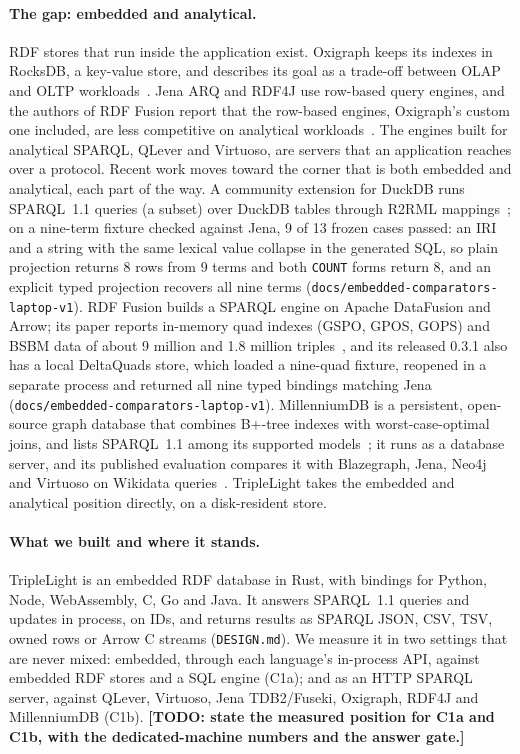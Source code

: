 \documentclass[sigconf, nonacm]{acmart}
\newcommand{\todo}[1]{\textbf{[TODO: #1]}}
\begin{document}
\paragraph{The gap: embedded and analytical.} RDF stores that run inside the application exist. Oxigraph keeps its indexes in RocksDB, a key-value store, and describes its goal as a trade-off between OLAP and OLTP workloads~\cite{oxigraphwiki}. Jena ARQ and RDF4J use row-based query engines, and the authors of RDF Fusion report that the row-based engines, Oxigraph's custom one included, are less competitive on analytical workloads~\cite{schwarzinger2025}. The engines built for analytical SPARQL, QLever and Virtuoso, are servers that an application reaches over a protocol.
Recent work moves toward the corner that is both embedded and analytical, each part of the way. A community extension for DuckDB runs SPARQL~1.1 queries (a subset) over DuckDB tables through R2RML mappings~\cite{duckdbrdf}; on a nine-term fixture checked against Jena, 9 of 13 frozen cases passed: an IRI and a string with the same lexical value collapse in the generated SQL, so plain projection returns 8 rows from 9 terms and both \texttt{COUNT} forms return 8, and an explicit typed projection recovers all nine terms (\texttt{docs/embedded-comparators-laptop-v1}).
RDF Fusion builds a SPARQL engine on Apache DataFusion and Arrow; its paper reports in-memory quad indexes (GSPO, GPOS, GOPS) and BSBM data of about 9 million and 1.8 million triples~\cite{schwarzinger2025}, and its released 0.3.1 also has a local DeltaQuads store, which loaded a nine-quad fixture, reopened in a separate process and returned all nine typed bindings matching Jena (\texttt{docs/embedded-comparators-laptop-v1}).
MillenniumDB is a persistent, open-source graph database that combines B+-tree indexes with worst-case-optimal joins, and lists SPARQL~1.1 among its supported models~\cite{vrgoc2021,mdbreadme}; it runs as a database server, and its published evaluation compares it with Blazegraph, Jena, Neo4j and Virtuoso on Wikidata queries~\cite{vrgoc2021}.
TripleLight takes the embedded and analytical position directly, on a disk-resident store.

\paragraph{What we built and where it stands.} TripleLight is an embedded RDF database in Rust, with bindings for Python, Node, WebAssembly, C, Go and Java.
It answers SPARQL~1.1 queries and updates in process, on IDs, and returns results as SPARQL JSON, CSV, TSV, owned rows or Arrow C streams
(\texttt{DESIGN.md}). We measure it in two settings that are never mixed: embedded, through each language's in-process API, against embedded
RDF stores and a SQL engine (C1a); and as an HTTP SPARQL server, against QLever, Virtuoso, Jena TDB2/Fuseki, Oxigraph, RDF4J and MillenniumDB (C1b).
\todo{state the measured position for C1a and C1b, with the dedicated-machine numbers and the answer gate.}
\end{document}
